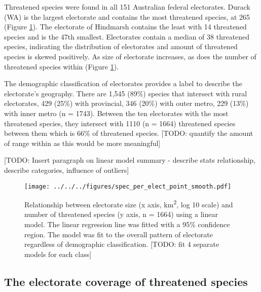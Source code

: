 \documentclass[a4paper,11pt]{article}
\begin{document}
Threatened species were found in all 151 Australian federal electorates. Durack (WA) is the largest electorate and contains the most threatened species, at 265 (Figure \ref{fig:point_smooth}). The electorate of Hindmarsh contains the least with 14 threatened species and is the 47th smallest. Electorates contain a median of 38 threatened species, indicating the distribution of electorates and amount of threatened species is skewed positively. As size of electorate increases, as does the number of threatened species within (Figure \ref{fig:point_smooth}).

The demographic classification of electorates provides a label to describe the electorate's geography. There are 1,545 (89\%) species that intersect with rural electorates, 429 (25\%) with provincial, 346 (20\%) with outer metro, 229 (13\%) with inner metro (n = 1743). Between the ten electorates with the most threatened species, they intersect with 1110 (n = 1664) threatened species between them which is 66\% of threatened species.
[TODO: quantify the amount of range within as this would be more meaningful]


[TODO: Insert paragraph on linear model summary - describe stats relationship, describe categories, influence of outliers]

\begin{figure}[H]
	\centering
    \texttt{[image: ../../../figures/spec\_per\_elect\_point\_smooth.pdf]}
    \caption{Relationship between electorate size (x axis, km\textsuperscript{2}, log 10 scale) and number of threatened species (y axis, n = 1664) using a linear model. The linear regression line was fitted with a 95\% confidence region. The model was fit to the overall pattern of electorate regardless of demographic classification. [TODO: fit 4 separate models for each class]}
    \label{fig:point_smooth}
\end{figure}

\subsection{The electorate coverage of threatened species}
\end{document}

